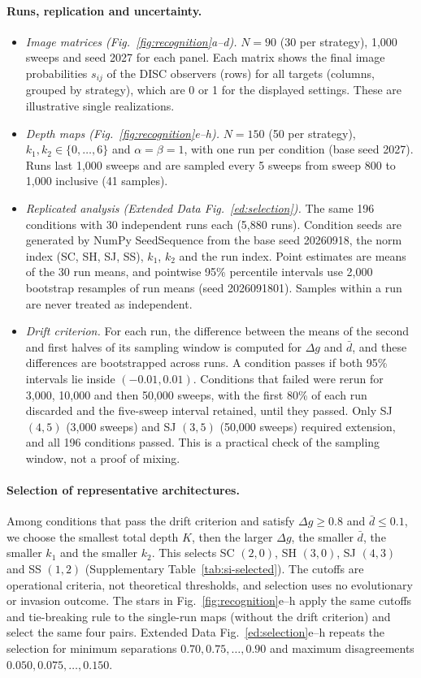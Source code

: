 \documentclass[fleqn,10pt]{wlscirep}
\theoremstyle{plain}
\begin{document}
\paragraph{Runs, replication and uncertainty.}
\begin{itemize}
\item \textit{Image matrices (Fig.~\ref{fig:recognition}a--d).} $N=90$ (30 per strategy), 1,000 sweeps and seed 2027 for each panel. Each matrix shows the final image probabilities $s_{ij}$ of the DISC observers (rows) for all targets (columns, grouped by strategy), which are 0 or 1 for the displayed settings. These are illustrative single realizations.
\item \textit{Depth maps (Fig.~\ref{fig:recognition}e--h).} $N=150$ (50 per strategy), $k_1,k_2\in\{0,\ldots,6\}$ and $\alpha=\beta=1$, with one run per condition (base seed 2027). Runs last 1,000 sweeps and are sampled every 5 sweeps from sweep 800 to 1,000 inclusive (41 samples).
\item \textit{Replicated analysis (Extended Data Fig.~\ref{ed:selection}).} The same 196 conditions with 30 independent runs each (5,880 runs). Condition seeds are generated by NumPy SeedSequence from the base seed 20260918, the norm index (SC, SH, SJ, SS), $k_1$, $k_2$ and the run index. Point estimates are means of the 30 run means, and pointwise 95\% percentile intervals use 2,000 bootstrap resamples of run means (seed 2026091801). Samples within a run are never treated as independent.
\item \textit{Drift criterion.} For each run, the difference between the means of the second and first halves of its sampling window is computed for $\Delta g$ and $\bar d$, and these differences are bootstrapped across runs. A condition passes if both 95\% intervals lie inside $(-0.01,0.01)$. Conditions that failed were rerun for 3,000, 10,000 and then 50,000 sweeps, with the first 80\% of each run discarded and the five-sweep interval retained, until they passed. Only SJ $(4,5)$ (3,000 sweeps) and SJ $(3,5)$ (50,000 sweeps) required extension, and all 196 conditions passed. This is a practical check of the sampling window, not a proof of mixing.
\end{itemize}

\paragraph{Selection of representative architectures.} Among conditions that pass the drift criterion and satisfy $\Delta g\geq0.8$ and $\bar d\leq0.1$, we choose the smallest total depth $K$, then the larger $\Delta g$, the smaller $\bar d$, the smaller $k_1$ and the smaller $k_2$. This selects SC $(2,0)$, SH $(3,0)$, SJ $(4,3)$ and SS $(1,2)$ (Supplementary Table~\ref{tab:si-selected}). The cutoffs are operational criteria, not theoretical thresholds, and selection uses no evolutionary or invasion outcome. The stars in Fig.~\ref{fig:recognition}e--h apply the same cutoffs and tie-breaking rule to the single-run maps (without the drift criterion) and select the same four pairs. Extended Data Fig.~\ref{ed:selection}e--h repeats the selection for minimum separations $0.70,0.75,\ldots,0.90$ and maximum disagreements $0.050,0.075,\ldots,0.150$.
\end{document}
